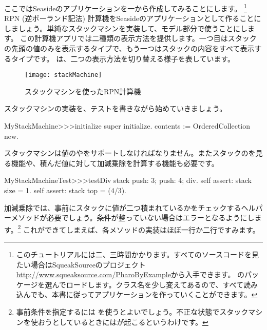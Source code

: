 \documentclass[a4paper,10pt,twoside]{book}
\begin{document}

ここではSeasideのアプリケーションを一から作成してみることにします。 \footnote{このチュートリアルには二、三時間かかります。すべてのソースコードを見たい場合はSqueakSourceのプロジェクト \url{http://www.squeaksource.com/PharoByExample}から入手できます。
のパッケージを選んでロードします。クラス名を少し変えてあるので、すべて読み込んでも、本書に従ってアプリケーションを作っていくことができます。}
RPN (逆ポーランド記法) 計算機をSeasideのアプリケーションとして作ることにしましょう。単純なスタックマシンを実装して、モデル部分で使うことにします。
この計算機アプリでは二種類の表示方法を提供します。一つ目はスタックの先頭の値のみを表示するタイプで、もう一つはスタックの内容をすべて表示するタイプです。
は、二つの表示方法を切り替える様子を表しています。

\begin{figure}[ht]
\begin{center}
\texttt{[image: stackMachine]}
\caption{スタックマシンを使ったRPN計算機}
\end{center}
\end{figure}

スタックマシンの実装を、テストを書きながら始めていきましょう。


\begin{code}{}
MyStackMachine>>>initialize
	super initialize.
	contents := OrderedCollection new.
\end{code}

スタックマシンは値のやをサポートしなければなりません。またスタックのを見る機能や、積んだ値に対して加減乗除を計算する機能も必要です。


\begin{code}{}
MyStackMachineTest>>>testDiv
	stack
		push: 3;
		push: 4;
		div.
	self assert: stack size = 1.
	self assert: stack top = (4/3).
\end{code}

加減乗除では、事前にスタックに値が二つ積まれているかをチェックするヘルパーメソッドが必要でしょう。条件が整っていない場合はエラーとなるようにします。\footnote{事前条件を指定するには  を使うとよいでしょう。不正な状態でスタックマシンを使おうとしているときにはが起こるというわけです。}
これができてしまえば、各メソッドの実装はほぼ一行か二行ですみます。
\end{document}
